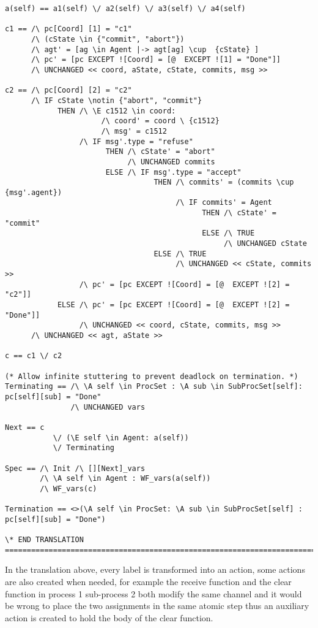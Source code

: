 \documentclass{thesul}
\begin{document}
\begin{appendices}
\begin{lstlisting}[caption = TLA+ translation for Sub-Processes, frame = tlrb, firstnumber = 1]
a(self) == a1(self) \/ a2(self) \/ a3(self) \/ a4(self)

c1 == /\ pc[Coord] [1] = "c1"
      /\ (cState \in {"commit", "abort"})
      /\ agt' = [ag \in Agent |-> agt[ag] \cup  {cState} ]
      /\ pc' = [pc EXCEPT ![Coord] = [@  EXCEPT ![1] = "Done"]]
      /\ UNCHANGED << coord, aState, cState, commits, msg >>

c2 == /\ pc[Coord] [2] = "c2"
      /\ IF cState \notin {"abort", "commit"}
            THEN /\ \E c1512 \in coord:
                      /\ coord' = coord \ {c1512}
                      /\ msg' = c1512
                 /\ IF msg'.type = "refuse"
                       THEN /\ cState' = "abort"
                            /\ UNCHANGED commits
                       ELSE /\ IF msg'.type = "accept"
                                  THEN /\ commits' = (commits \cup {msg'.agent})
                                       /\ IF commits' = Agent
                                             THEN /\ cState' = "commit"
                                             ELSE /\ TRUE
                                                  /\ UNCHANGED cState
                                  ELSE /\ TRUE
                                       /\ UNCHANGED << cState, commits >>
                 /\ pc' = [pc EXCEPT ![Coord] = [@  EXCEPT ![2] = "c2"]]
            ELSE /\ pc' = [pc EXCEPT ![Coord] = [@  EXCEPT ![2] = "Done"]]
                 /\ UNCHANGED << coord, cState, commits, msg >>
      /\ UNCHANGED << agt, aState >>

c == c1 \/ c2

(* Allow infinite stuttering to prevent deadlock on termination. *)
Terminating == /\ \A self \in ProcSet : \A sub \in SubProcSet[self]: pc[self][sub] = "Done"
               /\ UNCHANGED vars

Next == c
           \/ (\E self \in Agent: a(self))
           \/ Terminating

Spec == /\ Init /\ [][Next]_vars
        /\ \A self \in Agent : WF_vars(a(self))
        /\ WF_vars(c)

Termination == <>(\A self \in ProcSet: \A sub \in SubProcSet[self] : pc[self][sub] = "Done")

\* END TRANSLATION
=============================================================================

\end{lstlisting}

In the translation above, every label is transformed into an action, some actions are also created when needed, for example the receive function and the clear function in process 1 sub-process 2 both modify the same channel and it would be wrong to place the two assignments in the same atomic step thus an auxiliary action is created to hold the body of the clear function.


\end{appendices}
\end{document}
